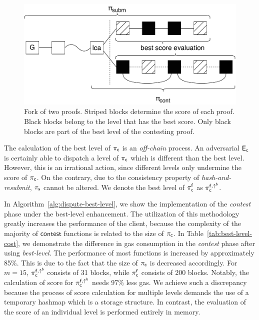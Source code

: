 \begin{figure}[!h]
    \begin{center}
    \includegraphics[width=0.6\columnwidth]{figures/blocks-of-best-level.pdf}
    \end{center}
    \caption{Fork of two proofs. Striped blocks determine the
    score of each proof. Black blocks belong to the level that
    has the best score. Only black blocks are part of the best level of the
    contesting proof.}
    \label{fig:score-at-levels}
\end{figure}


The calculation of the best level of $\mathsf{\pi_{c}}$ is an \emph{off-chain} process.
An adversarial $\mathsf{E_{c}}$ is certainly able to dispatch a level of $\mathsf{\pi_{c}}$ which is
different than the best level. However, this is an irrational action, since
different levels only undermine the score of $\mathsf{\pi_{c}}$. On the contrary, due to
the consistency property of \emph{hash-and-resubmit}, $\mathsf{\pi_{s}}$ cannot be altered.
We denote the best level of $\mathsf{\pi_{c}^{f}}$ as $\mathsf{\pi_{c}^{f, \uparrow^{b}}}$.

In Algorithm~\ref{alg:dispute-best-level}, we show the implementation of the
\emph{contest} phase under the best-level enhancement. The utilization of
this methodology greatly increases the performance of the client,
because the complexity of the majority of $\textsf{contest}$ functions is
related to the size of $\mathsf{\pi_{c}}$. In Table~\ref{tab:best-level-cost}, we
demonstrate the difference in gas consumption in the \emph{contest} phase after
using \emph{best-level}. The performance of most functions is increased by
approximately 85\%. This is due to the fact that the size of $\mathsf{\pi_{c}}$ is
decreased accordingly. For $m=15$, $\mathsf{\pi_{c}^{f, \uparrow^{b}}}$ consists of 31 blocks, while
$\mathsf{\pi_{c}^{f}}$ consists of 200 blocks.  Notably, the calculation of score for $\mathsf{\pi_{c}^{f, \uparrow^{b}}}$
needs 97\% less gas. We achieve such a discrepancy because the process of score
calculation for multiple levels demands the use of a temporary hashmap which is
a storage structure. In contrast, the evaluation of the score of an individual level
is performed entirely in memory.



